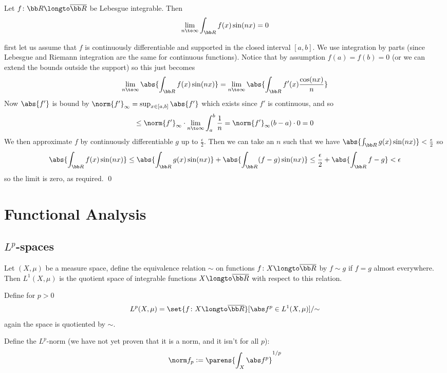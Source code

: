 \bthrm

    Let $f\colon{\bb R}\longto\overline{\bb R}$ be Lebesgue integrable.
    Then
    $$ \lim_{n\to\infty}\int_{\bb R}f(x)\sin(nx) = 0 $$

\ethrm

\Proof first let us assume that $f$ is continuously differentiable and supported in the closed interval $[a,b]$.
We use integration by parts (since Lebesgue and Riemann integration are the same for continuous functions).
Notice that by assumption $f(a)=f(b)=0$ (or we can extend the bounds outside the support) so this just becomes
$$ \lim_{n\to\infty}\abs{\int_{\bb R}f(x)\sin(nx)} = \lim_{n\to\infty}\abs{\int_{\bb R}f'(x)\frac{\cos(nx)}n} $$
Now $\abs{f'}$ is bound by $\norm{f'}_\infty=\sup_{x\in[a,b]}\abs{f'}$ which exists since $f'$ is continuous, and so
$$ \leq \norm{f'}_\infty\cdot\lim_{n\to\infty}\int_a^b\frac1n = \norm{f'}_\infty(b-a)\cdot0 = 0 $$
We then approximate $f$ by continuously differentiable $g$ up to $\frac\epsilon2$.
Then we can take an $n$ such that we have $\abs{\int_{\bb R}g(x)\sin(nx)}<\frac\epsilon2$ so
$$ \abs{\int_{\bb R}f(x)\sin(nx)} \leq \abs{\int_{\bb R}g(x)\sin(nx)} + \abs{\int_{\bb R}(f-g)\sin(nx)} \leq \frac\epsilon2 + \abs{\int_{\bb R}f-g} < \epsilon $$
so the limit is zero, as required.
\qed

\vfill\break
\section{Functional Analysis}

\subsection{$L^p$-spaces}

\bdefn

    Let $(X,\mu)$ be a measure space, define the equivalence relation $\sim$ on functions $f\colon X\longto\overline{\bb R}$ by $f\sim g$ if $f=g$ almost everywhere.
    Then $L^1(X,\mu)$ is the quotient space of integrable functions $X\longto\overline{\bb R}$ with respect to this relation.

    Define for $p>0$
    $$ L^p(X,\mu) = \set{f\colon X\longto\overline{\bb R}}[\abs f^p\in L^1(X,\mu)]/{\sim} $$
    again the space is quotiented by $\sim$.

    Define the $L^p$-norm (we have not yet proven that it is a norm, and it isn't for all $p$):
    $$ \norm f_p \coloneqq \parens{\int_X\abs f^p}^{1/p} $$

